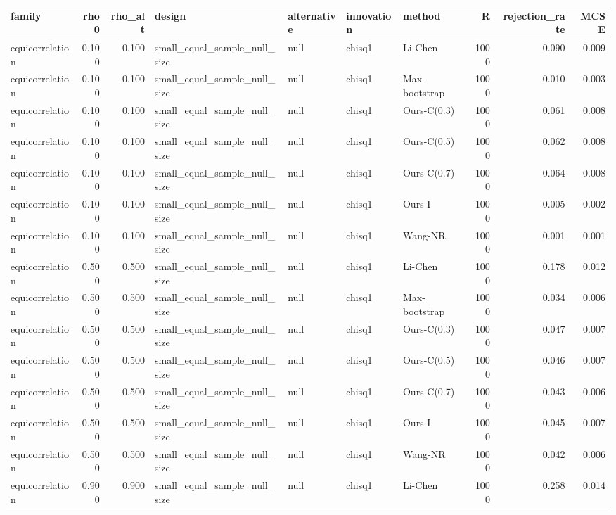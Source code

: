 \begin{tabular}{lrrllllrrr}
\toprule
family & rho0 & rho\_alt & design & alternative & innovation & method & R & rejection\_rate & MCSE \\
\midrule
equicorrelation & 0.100 & 0.100 & small\_equal\_sample\_null\_size & null & chisq1 & Li-Chen & 1000 & 0.090 & 0.009 \\
equicorrelation & 0.100 & 0.100 & small\_equal\_sample\_null\_size & null & chisq1 & Max-bootstrap & 1000 & 0.010 & 0.003 \\
equicorrelation & 0.100 & 0.100 & small\_equal\_sample\_null\_size & null & chisq1 & Ours-C(0.3) & 1000 & 0.061 & 0.008 \\
equicorrelation & 0.100 & 0.100 & small\_equal\_sample\_null\_size & null & chisq1 & Ours-C(0.5) & 1000 & 0.062 & 0.008 \\
equicorrelation & 0.100 & 0.100 & small\_equal\_sample\_null\_size & null & chisq1 & Ours-C(0.7) & 1000 & 0.064 & 0.008 \\
equicorrelation & 0.100 & 0.100 & small\_equal\_sample\_null\_size & null & chisq1 & Ours-I & 1000 & 0.005 & 0.002 \\
equicorrelation & 0.100 & 0.100 & small\_equal\_sample\_null\_size & null & chisq1 & Wang-NR & 1000 & 0.001 & 0.001 \\
equicorrelation & 0.500 & 0.500 & small\_equal\_sample\_null\_size & null & chisq1 & Li-Chen & 1000 & 0.178 & 0.012 \\
equicorrelation & 0.500 & 0.500 & small\_equal\_sample\_null\_size & null & chisq1 & Max-bootstrap & 1000 & 0.034 & 0.006 \\
equicorrelation & 0.500 & 0.500 & small\_equal\_sample\_null\_size & null & chisq1 & Ours-C(0.3) & 1000 & 0.047 & 0.007 \\
equicorrelation & 0.500 & 0.500 & small\_equal\_sample\_null\_size & null & chisq1 & Ours-C(0.5) & 1000 & 0.046 & 0.007 \\
equicorrelation & 0.500 & 0.500 & small\_equal\_sample\_null\_size & null & chisq1 & Ours-C(0.7) & 1000 & 0.043 & 0.006 \\
equicorrelation & 0.500 & 0.500 & small\_equal\_sample\_null\_size & null & chisq1 & Ours-I & 1000 & 0.045 & 0.007 \\
equicorrelation & 0.500 & 0.500 & small\_equal\_sample\_null\_size & null & chisq1 & Wang-NR & 1000 & 0.042 & 0.006 \\
equicorrelation & 0.900 & 0.900 & small\_equal\_sample\_null\_size & null & chisq1 & Li-Chen & 1000 & 0.258 & 0.014 \\

\end{tabular}
